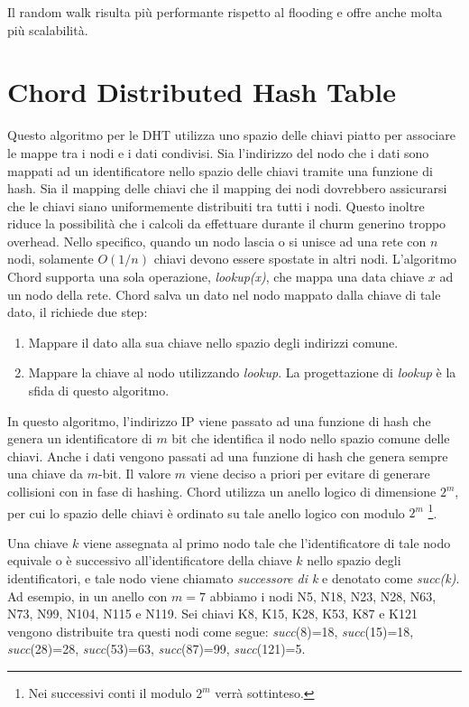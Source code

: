 Il random walk risulta più performante rispetto al flooding e offre anche molta più scalabilità.


\section{Chord Distributed Hash Table}\label{chord-distributed-hash-table}

Questo algoritmo per le DHT utilizza uno spazio delle chiavi piatto per associare le mappe tra i nodi e i dati condivisi. Sia l'indirizzo del nodo che i dati sono mappati ad un identificatore nello spazio delle chiavi tramite una funzione di hash. Sia il mapping delle chiavi che il mapping dei nodi dovrebbero assicurarsi che le chiavi siano uniformemente distribuiti tra tutti i nodi. Questo inoltre riduce la possibilità che i calcoli da effettuare durante il churm generino troppo overhead. Nello specifico, quando un nodo lascia o si unisce ad una rete con $n$ nodi, solamente $O(1/n)$ chiavi devono essere spostate in altri nodi. L'algoritmo Chord supporta una sola operazione, \emph{lookup(x)}, che mappa una data chiave $x$ ad un nodo della rete. Chord salva un dato nel nodo mappato dalla chiave di tale dato, il richiede due step:

\begin{enumerate}
\def\labelenumi{\arabic{enumi}.}
\itemsep1pt\parskip0pt
\item
  Mappare il dato alla sua chiave nello spazio degli indirizzi comune.
\item
  Mappare la chiave al nodo utilizzando \emph{lookup}. La progettazione   di \emph{lookup} è la sfida di questo algoritmo.
\end{enumerate}

In questo algoritmo, l'indirizzo IP viene passato ad una funzione di hash che genera un identificatore di $m$ bit che identifica il nodo nello spazio comune delle chiavi. Anche i dati vengono passati ad una funzione di hash che genera sempre una chiave da $m$-bit. Il valore $m$ viene deciso a priori per evitare di generare collisioni con in fase di hashing. Chord utilizza un anello logico di dimensione $2^m$, per cui lo spazio delle chiavi è ordinato su tale anello logico con modulo $2^m$ \footnote{Nei successivi conti il modulo $2^m$ verrà sottinteso.}.

Una chiave $k$ viene assegnata al primo nodo tale che l'identificatore di tale nodo equivale o è successivo all'identificatore della chiave $k$ nello spazio degli identificatori, e tale nodo viene chiamato \emph{successore di k} e denotato come \emph{succ(k)}. Ad esempio, in un anello con $m=7$ abbiamo i nodi N5, N18, N23, N28, N63, N73, N99, N104, N115 e N119. Sei chiavi K8, K15, K28, K53, K87 e K121 vengono distribuite tra questi nodi come segue: \emph{succ}(8)=18, \emph{succ}(15)=18, \emph{succ}(28)=28, \emph{succ}(53)=63, \emph{succ}(87)=99, \emph{succ}(121)=5.

